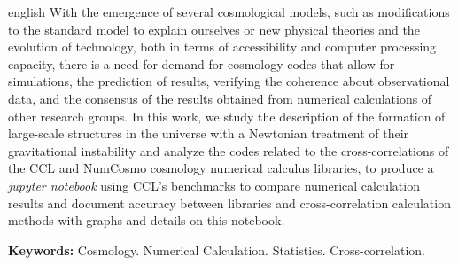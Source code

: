 \documentclass[12pt,a4paper,oneside,brazil]{abntex2}
\theoremstyle{definition}
\numberwithin{defin}{section}
\numberwithin{thm}{section}
\numberwithin{notation}{section}
\theoremstyle{remark}
\numberwithin{exmp}{section}
\numberwithin{p}{section}
\numberwithin{lema}{section}
\begin{document}
	\begin{resumo}[Abstract]
		
		\begin{otherlanguage*}{english}
			With the emergence of several cosmological models, such as modifications to the standard model to explain ourselves or new physical theories and the evolution of technology, both in terms of accessibility and computer processing capacity, there is a need for demand for cosmology codes that allow for simulations, the prediction of results, verifying the coherence about observational data, and the consensus of the results obtained from numerical calculations of other research groups. In this work, we study the description of the formation of large-scale structures in the universe with a Newtonian treatment of their gravitational instability and analyze the codes related to the cross-correlations of the CCL and NumCosmo cosmology numerical calculus libraries, to produce a \textit{jupyter notebook} using CCL's benchmarks to compare numerical calculation results and document accuracy between libraries and cross-correlation calculation methods with graphs and details on this notebook. 
			
			\textbf{Keywords:} Cosmology. Numerical Calculation. Statistics. Cross-correlation.
		\end{otherlanguage*}
		
	\end{resumo}
	
	
	\listoffigures*
	
	
	
	
	
	\cleardoublepage
	
	
	\tableofcontents*
	
	\cleardoublepage
	
	\textual
	\setcounter{page}{1}
	
	
	
	
	
		
	
	\postextual
	
	
	
\end{document}
